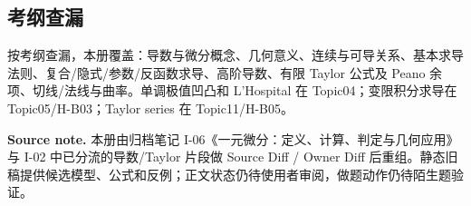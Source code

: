 \documentclass[11pt,a4paper]{ctexart}
\begin{document}
\subsection{考纲查漏}

按考纲查漏，本册覆盖：导数与微分概念、几何意义、连续与可导关系、基本求导法则、复合/隐式/参数/反函数求导、高阶导数、有限 Taylor 公式及 Peano 余项、切线/法线与曲率。单调极值凹凸和 L'Hospital 在 Topic04；变限积分求导在 Topic05/H-B03；Taylor series 在 Topic11/H-B05。

\noindent\textbf{Source note.} 本册由归档笔记 I-06《一元微分：定义、计算、判定与几何应用》与 I-02 中已分流的导数/Taylor 片段做 Source Diff / Owner Diff 后重组。静态旧稿提供候选模型、公式和反例；正文状态仍待使用者审阅，做题动作仍待陌生题验证。
\end{document}
